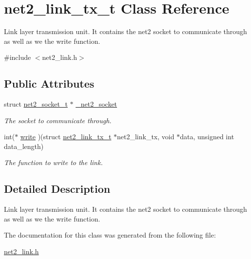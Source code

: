 \hypertarget{structnet2__link__tx__t}{\section{net2\-\_\-link\-\_\-tx\-\_\-t Class Reference}
\label{structnet2__link__tx__t}
}


Link layer transmission unit. It contains the net2 socket to communicate through as well as we the write function.  




{\ttfamily \#include $<$net2\-\_\-link.\-h$>$}

\subsection*{Public Attributes}
\begin{DoxyCompactItemize}
\item 
\hypertarget{structnet2__link__tx__t_a1477f4035255d5c451804403abe93d26}{struct \hyperlink{structnet2__socket__t}{net2\-\_\-socket\-\_\-t} $\ast$ \hyperlink{structnet2__link__tx__t_a1477f4035255d5c451804403abe93d26}{\-\_\-net2\-\_\-socket}}\label{structnet2__link__tx__t_a1477f4035255d5c451804403abe93d26}

\begin{DoxyCompactList}\small\item\em The socket to communicate through. \end{DoxyCompactList}\item 
\hypertarget{structnet2__link__tx__t_a96b3cabed416576fad4bbaa17caf043e}{int($\ast$ \hyperlink{structnet2__link__tx__t_a96b3cabed416576fad4bbaa17caf043e}{write} )(struct \hyperlink{structnet2__link__tx__t}{net2\-\_\-link\-\_\-tx\-\_\-t} $\ast$net2\-\_\-link\-\_\-tx, void $\ast$data, unsigned int data\-\_\-length)}\label{structnet2__link__tx__t_a96b3cabed416576fad4bbaa17caf043e}

\begin{DoxyCompactList}\small\item\em The function to write to the link. \end{DoxyCompactList}\end{DoxyCompactItemize}


\subsection{Detailed Description}
Link layer transmission unit. It contains the net2 socket to communicate through as well as we the write function. 

The documentation for this class was generated from the following file\-:\begin{DoxyCompactItemize}
\item 
\hyperlink{net2__link_8h}{net2\-\_\-link.\-h}\end{DoxyCompactItemize}

